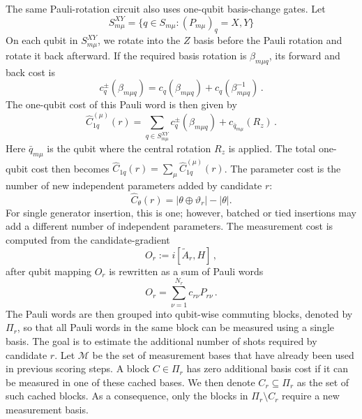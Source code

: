 \documentclass[
  reprint,
  amsmath,
  amssymb,
  aps,
  pra,
  nofootinbib,
  superscriptaddress,
  floatfix
]{revtex4-2}
\begin{document}
\noindent
The same Pauli-rotation circuit also uses one-qubit basis-change gates. Let
\[
S_{m\mu}^{XY} = \{q\in S_{m\mu}:(P_{m\mu})_q = X, Y\}
\]
On each qubit in \(S_{m\mu}^{XY}\), we rotate into the \(Z\) basis before the Pauli rotation and rotate it back afterward. If the required basis rotation is $\beta_{m\mu q}$, its forward and back cost is 
\[
c_q^{\pm}(\beta_{m\mu q})=c_q(\beta_{m\mu q})+c_q(\beta^{-1}_{m\mu q})\,.
\]
The one-qubit cost of this Pauli word is then given by
%
\begin{equation}
\widehat{C}_{1q}^{(\mu)}(r) = \sum_{q\in S_{m\mu}^{XY}}c_q^\pm(\beta_{m\mu q}) + c_{\bar{q}_{m\mu}}(R_z)\,.
\end{equation}
%
Here \(\bar{q}_{m\mu}\) is the qubit where the central rotation \(R_z\) is applied. The total one-qubit cost then becomes \(\widehat{C}_{1q}(r)=\sum_\mu\widehat{C}_{1q}^{(\mu)}(r)\). The parameter cost is the number of new independent parameters added by candidate \(r\):
%
\begin{equation}
\widehat C_\theta(r)
=
|\theta\oplus\vartheta_r|-|\theta|.
\label{eq:parameter_cost_proxy}
\end{equation}
%
For single generator insertion, this is one; however, batched or tied insertions may add a different number of independent parameters. The measurement cost is computed from the candidate-gradient\cite{Verteletskyi2020CliqueCover,Yen2020CompatibleMeasurements}
\[
O_r:=i[\widetilde A_r,H]\,,
\]
after qubit mapping \(O_r\) is rewritten as a sum of Pauli words 
%
\[
O_r=\sum_{\nu=1}^{N_r}c_{r\nu}P_{r\nu}\,.
\]
%
The Pauli words are then grouped into qubit-wise commuting blocks, denoted by \(\Pi_r\), so that all Pauli words in the same block can be measured using a single basis. The goal is to estimate the additional number of shots required by candidate \(r\). Let \(\mathcal M\) be the set of measurement bases that have already been used in previous scoring steps. A block \(C\in\Pi_r\) has zero additional basis cost if it can be measured in one of these cached bases. We then denote \(C_r\subseteq\Pi_r\) as the set of such cached blocks. As a consequence, only the blocks in \(\Pi_r\setminus C_r\) require a new measurement basis.
\end{document}
